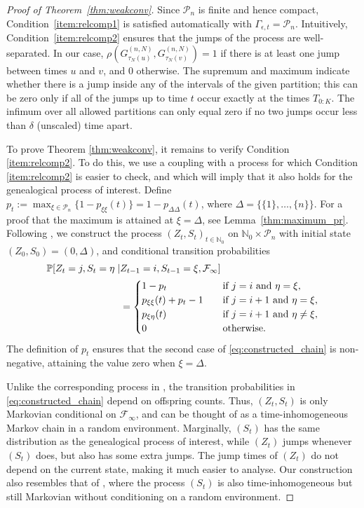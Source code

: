 \documentclass[12pt,authoryear]{article}
\theoremstyle{definition}
\newcommand{\Prob}{\mathbb{P}}
\newcommand{\1}[1]{\mathbbm{1}_{#1}}
\begin{document}
\begin{proof}[Proof of Theorem~\ref{thm:weakconv}]
Since $\mathcal{P}_n$ is finite and hence compact, Condition~\ref{item:relcomp1} is satisfied automatically with $\Gamma_{ \epsilon, t } = \mathcal{P}_n$. 
Intuitively, Condition~\ref{item:relcomp2} ensures that the jumps of the process are well-separated. 
In our case, $\rho( G_{\tau_N(u)}^{(n,N)}, G_{\tau_N(v)}^{(n,N)} ) = 1$ if there is at least one jump between times $u$ and $v$, and 0 otherwise.
The supremum and maximum indicate whether there is a jump inside any of the intervals of the given partition; this can be zero only if all of the jumps up to time $t$ occur exactly at the times $T_{ 0 : K }$. 
The infimum over all allowed partitions can only equal zero if no two jumps occur less than $\delta$ (unscaled) time apart.

To prove Theorem \ref{thm:weakconv}, it remains to verify Condition \ref{item:relcomp2}.
To do this, we use a coupling with a process for which Condition \ref{item:relcomp2} is easier to check, and which will imply that it also holds for the genealogical process of interest.
Define $p_t := \max_{\xi\in \mathcal{P}_n} \{1 - p_{\xi\xi}(t)\} = 1 - p_{\Delta\Delta}(t)$, where $\Delta = \{ \{1\},\dots, \{n\} \}$.
For a proof that the maximum is attained at $\xi = \Delta$, see Lemma~\ref{thm:maximum_pr}. 
Following \citet{mohle1999}, we construct the process $(Z_t, S_t)_{t \in \mathbb{N}_0}$ on $\mathbb{N}_0 \times \mathcal{P}_n$ with initial state $( Z_0, S_0 ) = ( 0, \Delta )$, and conditional transition probabilities
\begin{align}
\Prob[ Z_t = j , S_t = \eta \mid& Z_{t-1} = i, S_{t-1} = \xi, \mathcal{F}_\infty ] \notag\\
&= \begin{cases}
1 - p_t &\quad \text{if } j=i \text{ and } \eta=\xi, \\
p_{\xi\xi}(t) + p_t - 1  &\quad \text{if } j=i+1 \text{ and } \eta=\xi, \\
p_{\xi\eta}(t) &\quad \text{if } j=i+1 \text{ and } \eta\neq\xi, \\
0 &\quad \text{otherwise}.
\end{cases}
\label{eq:constructed_chain}
\end{align}
The definition of $p_t$ ensures that the second case of \eqref{eq:constructed_chain} is non-negative, attaining the value zero when $\xi=\Delta$.

Unlike the corresponding process in \citet{mohle1999}, the transition probabilities in \eqref{eq:constructed_chain} depend on offspring counts. Thus, $(Z_t, S_t)$ is only Markovian conditional on $\mathcal{F}_\infty$, and can be thought of as a time-inhomogeneous Markov chain in a random environment.
Marginally, $(S_t)$ has the same distribution as the genealogical process of interest, while $(Z_t)$ jumps whenever $(S_t)$ does, but also has some extra jumps.
The jump times of $(Z_t)$ do not depend on the current state, making it much easier to analyse.
Our construction also resembles that of \citet{mohle2002coal}, where the process $(S_t)$ is also time-inhomogeneous but still Markovian without conditioning on a random environment.


\end{proof}
\end{document}
